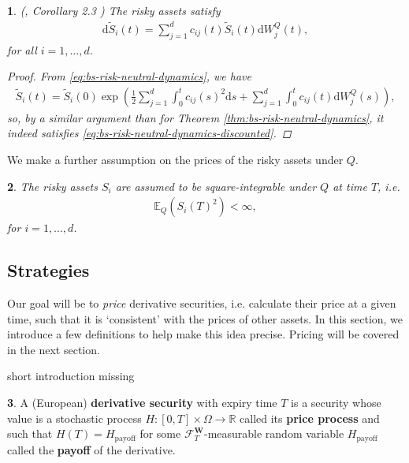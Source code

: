\documentclass[english]{article}
\newcommand{\comment}[1]{\color{blue}#1\color{black}}
\numberwithin{equation}{section}
\numberwithin{figure}{section}
\theoremstyle{bolddescit}
\newtheorem{theorem}{\protect\theoremname}[section]
\theoremstyle{definition}
\newtheorem{definition}[theorem]{\protect\definitionname}
\theoremstyle{definition}
\theoremstyle{plain}
\theoremstyle{plain}
\theoremstyle{bolddesc}
\newtheorem{assumption}[theorem]{\protect\assumptionname}
\theoremstyle{plain}
\theoremstyle{remark}
\providecommand{\assumptionname}{Assumption}
\providecommand{\definitionname}{Definition}
\providecommand{\theoremname}{Theorem}
\begin{document}
\begin{theorem}\label{thm:bs-risk-neutral-dynamics-discounted}
  (\cite{capinski_blackscholes_2012}, Corollary 2.3 )
  The risky assets satisfy
  \begin{align}\label{eq:bs-risk-neutral-dynamics-discounted}
    \mathrm{d}\widetilde{S}_i(t) = \sum_{j=1}^{d} c_{ij}(t) \widetilde{S}_i(t) \mathrm{d}W^Q_j(t),
  \end{align}
  for all $i=1,\ldots,d$.

  \begin{proof}
    From \eqref{eq:bs-risk-neutral-dynamics}, we have
    \begin{align*}
      \widetilde{S}_i(t)
      = \widetilde{S}_i(0) \exp \left( \frac{1}{2} \sum_{j=1}^{d} \int_0^t c_{ij}(s)^2 \mathrm{d}s + \sum_{j=1}^d \int_0^t c_{ij}(t) \mathrm{d}W^Q_j(s)\right),
    \end{align*}
    so, by a similar argument than for Theorem \ref{thm:bs-risk-neutral-dynamics}, it indeed satisfies \eqref{eq:bs-risk-neutral-dynamics-discounted}.
  \end{proof}
\end{theorem}

We make a further assumption on the prices of the risky assets under $Q$.

\begin{assumption}\label{ass:bs-stock-price-square-integrability}
  The risky assets $S_i$ are assumed to be square-integrable under $Q$ at time $T$, i.e.
  \begin{align*}
    \mathbb{E}_Q(S_i(T)^2) < \infty,
  \end{align*}
  for $i=1,\ldots,d$.
\end{assumption}

\subsection{Strategies}

Our goal will be to \textit{price} derivative securities, i.e. calculate their price at a given time, such that it is `consistent' with the prices of other assets. In this section, we introduce a few definitions to help make this idea precise. Pricing will be covered in the next section.

\comment{short introduction missing}

\begin{definition}
  A (European) \textbf{derivative security} with expiry time $T$ is a security whose value is a stochastic process $H : [0,T] \times \Omega \to \mathbb{R}$ called its \textbf{price process} and such that $H(T) = H_\text{payoff}$ for some $\mathcal{F}^\mathbf{W}_T$-measurable random variable $H_\text{payoff}$ called the \textbf{payoff} of the derivative.
\end{definition}
\end{document}
